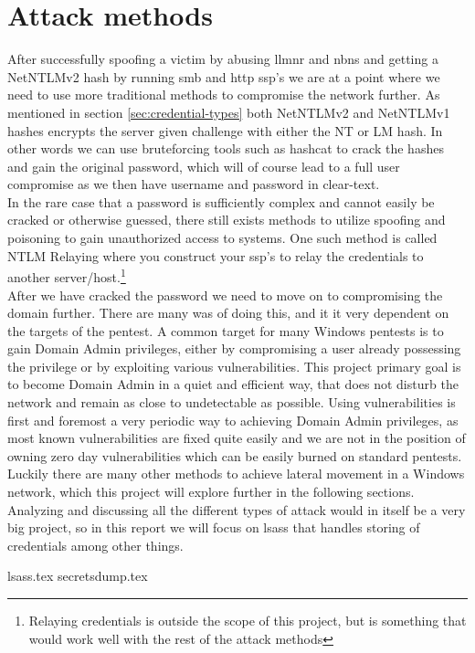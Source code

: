 \documentclass{article}
\begin{document}
\section{Attack methods}
After successfully spoofing a victim by abusing \gls{llmnr} and \gls{nbns} and getting a NetNTLMv2 hash by running \gls{smb} and \gls{http} \gls{ssp}'s we are at a point where we need to use more traditional methods to compromise the network further. As mentioned in section \ref{sec:credential-types} both NetNTLMv2 and NetNTLMv1 hashes encrypts the server given challenge with either the NT or LM hash. In other words we can use bruteforcing tools such as hashcat\cite{url:hashes:hashcat-example-hashes} to crack the hashes and gain the original password, which will of course lead to a full user compromise as we then have username and password in clear-text.
\\
In the rare case that a password is sufficiently complex and cannot easily be cracked or otherwise guessed, there still exists methods to utilize spoofing and poisoning to gain unauthorized access to systems. One such method is called NTLM Relaying\cite{url:ntlm-relaying} where you construct your \gls{ssp}'s to relay the credentials to another server/host.\footnote{Relaying credentials is outside the scope of this project, but is something that would work well with the rest of the attack methods}
\\
After we have cracked the password we need to move on to compromising the domain further. There are many was of doing this, and it it very dependent on the targets of the pentest. A common target for many Windows pentests is to gain Domain Admin privileges, either by compromising a user already possessing the privilege or by exploiting various vulnerabilities. This project primary goal is to become Domain Admin in a quiet and efficient way, that does not disturb the network and remain as close to undetectable as possible. Using vulnerabilities is first and foremost a very periodic way to achieving Domain Admin privileges, as most known vulnerabilities are fixed quite easily and we are not in the position of owning zero day vulnerabilities which can be easily burned on standard pentests. Luckily there are many other methods to achieve lateral movement in a Windows network, which this project will explore further in the following sections. Analyzing and discussing all the different types of attack would in itself be a very big project, so in this report we will focus on \gls{lsass} that handles storing of credentials among other things.

{lsass.tex}
{secretsdump.tex}
\end{document}
